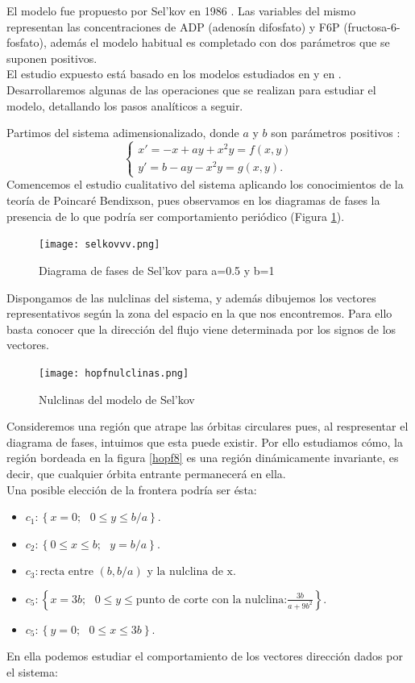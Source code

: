 El modelo fue propuesto por Sel'kov en 1986 \cite{sel}. Las variables del mismo representan las concentraciones de ADP (adenosín difosfato) y F6P (fructosa-6-fosfato), además el modelo habitual es completado con dos parámetros que se suponen positivos.\\
El estudio expuesto está basado en los modelos estudiados en \cite{gold} y en \cite{Strogatz}. Desarrollaremos algunas de las operaciones que se realizan para estudiar el modelo, detallando los pasos analíticos a seguir. 

Partimos del sistema adimensionalizado, donde $a$ y $b$ son parámetros positivos \cite{sel}:
\begin{equation}
 \left \{ \begin{matrix} x'=-x+ay+x^2y=f(x,y)\\ y'=b-ay-x^2y=g(x,y).\end{matrix}\right .
\end{equation}
Comencemos el estudio cualitativo del sistema aplicando los conocimientos de la teoría de Poincaré Bendixson, pues observamos en los diagramas de fases la presencia de lo que podría ser comportamiento periódico (Figura \ref{hopf9}).
\begin{figure}[h]
	\centering
	\texttt{[image: selkovvv.png]}
	\caption{Diagrama de fases de Sel'kov para a=0.5 y b=1 }
	\label{hopf9}
\end{figure}
Dispongamos de las nulclinas del sistema, y además dibujemos los vectores representativos según la zona del espacio en la que nos encontremos. Para ello basta conocer que la dirección del flujo viene determinada por los signos de los vectores. 

\begin{figure}[H]
	\centering
	\texttt{[image: hopfnulclinas.png]}
	\caption{Nulclinas del modelo de Sel'kov }
\label{hopf7}
\end{figure}

Consideremos una región que atrape las órbitas circulares pues, al respresentar el diagrama de fases, intuimos que esta puede existir. Por ello estudiamos cómo, la región bordeada en la figura \ref{hopf8} es una región dinámicamente invariante, es decir, que cualquier órbita entrante permanecerá en ella.\\ Una posible elección de la frontera podría ser ésta:
\begin{itemize}
	\item $c_1:\left\lbrace x=0;\text{ } 0\leq y\leq b/a\right\rbrace. $
	\item $c_2:\left\lbrace 0\leq x\leq b;\text{ } y= b/a\right\rbrace. $
	\item $c_3:\text{recta entre }(b,b/a)\text{ y la nulclina de x}. $
	\item $c_5:\left\lbrace x=3b;\text{ } 0\leq y\leq \text{punto de corte con la nulclina:}\frac{3b}{a+9b^2}\right\rbrace. $
	\item $c_5:\left\lbrace y=0;\text{ } 0\leq x\leq 3b\right\rbrace. $
	
\end{itemize}
En ella podemos estudiar el comportamiento de los vectores dirección dados por el sistema: 

